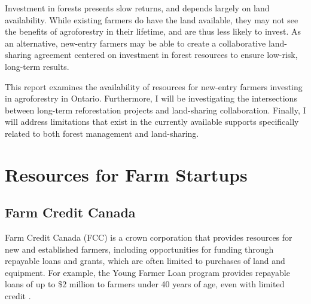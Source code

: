 \documentclass{report}
\begin{document}


\hspace{24pt}Investment in forests presents slow returns, and depends largely on land availability. While existing farmers do have the land available, they may not see the benefits of agroforestry in their lifetime, and are thus less likely to invest. As an alternative, new-entry farmers may be able to create a collaborative land-sharing agreement centered on investment in forest resources to ensure low-risk, long-term results.

\hspace{24pt}This report examines the availability of resources for new-entry farmers investing in agroforestry in Ontario. Furthermore, I will be investigating the intersections between long-term reforestation projects and land-sharing collaboration. Finally, I will address limitations that exist in the currently available supports specifically related to both forest management and land-sharing.

\section{Resources for Farm Startups}

\subsection{Farm Credit Canada}

\hspace{24pt}Farm Credit Canada (FCC) is a crown corporation that provides resources for new and established farmers, including opportunities for funding through repayable loans and grants, which are often limited to purchases of land and equipment. For example, the Young Farmer Loan program provides repayable loans of up to \$2 million to farmers under 40 years of age, even with limited credit \parencite{fcc_youngfarmers}.
\end{document}
